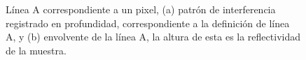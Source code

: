 

\begin{figure}[ht!]
	\centering
	\caption[Línea A medida experimentalmente]{Línea A correspondiente a un pixel, (a) patrón de interferencia registrado en profundidad, correspondiente a la definición de línea A, y (b) envolvente de la línea A, la altura de esta es la reflectividad de la muestra.}
	\label{fig:lineaa}
\end{figure}


